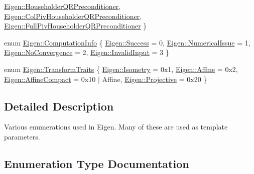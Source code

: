 \begin{DoxyCompactItemize}
\mbox{\hyperlink{group__enums_gga46eba0d5c621f590b8cf1b53af31d56ea9c660eb3336bf8c77ce9d081ca07cbdd}{Eigen\+::\+Householder\+Q\+R\+Preconditioner}}, 
\mbox{\hyperlink{group__enums_gga46eba0d5c621f590b8cf1b53af31d56eabd2e2f4875c5b4b6e602a433d90c4e5e}{Eigen\+::\+Col\+Piv\+Householder\+Q\+R\+Preconditioner}}, 
\mbox{\hyperlink{group__enums_gga46eba0d5c621f590b8cf1b53af31d56eabd745dcaff7019c5f918c68809e5ea50}{Eigen\+::\+Full\+Piv\+Householder\+Q\+R\+Preconditioner}}
 \}
\item 
enum \mbox{\hyperlink{group__enums_ga85fad7b87587764e5cf6b513a9e0ee5e}{Eigen\+::\+Computation\+Info}} \{ \mbox{\hyperlink{group__enums_gga85fad7b87587764e5cf6b513a9e0ee5ea671a2aeb0f527802806a441d58a80fcf}{Eigen\+::\+Success}} = 0, 
\mbox{\hyperlink{group__enums_gga85fad7b87587764e5cf6b513a9e0ee5ea1c6e20706575a629b27a105f07f1883b}{Eigen\+::\+Numerical\+Issue}} = 1, 
\mbox{\hyperlink{group__enums_gga85fad7b87587764e5cf6b513a9e0ee5ea6a68dfb88a8336108a30588bdf356c57}{Eigen\+::\+No\+Convergence}} = 2, 
\mbox{\hyperlink{group__enums_gga85fad7b87587764e5cf6b513a9e0ee5ea580b2a3cafe585691e789f768fb729bf}{Eigen\+::\+Invalid\+Input}} = 3
 \}
\item 
enum \mbox{\hyperlink{group__enums_gaee59a86102f150923b0cac6d4ff05107}{Eigen\+::\+Transform\+Traits}} \{ \mbox{\hyperlink{group__enums_ggaee59a86102f150923b0cac6d4ff05107a84413028615d2d718bafd2dfb93dafef}{Eigen\+::\+Isometry}} = 0x1, 
\mbox{\hyperlink{group__enums_ggaee59a86102f150923b0cac6d4ff05107a0872f0a82453aaae40339c33acbb31fb}{Eigen\+::\+Affine}} = 0x2, 
\mbox{\hyperlink{group__enums_ggaee59a86102f150923b0cac6d4ff05107a8192e8fdb2ec3ec46d92956cc83ef490}{Eigen\+::\+Affine\+Compact}} = 0x10 $\vert$ Affine, 
\mbox{\hyperlink{group__enums_ggaee59a86102f150923b0cac6d4ff05107a0f7338b8672884554e8642bce9e44183}{Eigen\+::\+Projective}} = 0x20
 \}
\end{DoxyCompactItemize}


\subsection{Detailed Description}
Various enumerations used in Eigen. Many of these are used as template parameters. 

\subsection{Enumeration Type Documentation}
\mbox{\label{group__enums_ga9f93eac38eb83deb0e8dbd42ddf11d5d}} 
